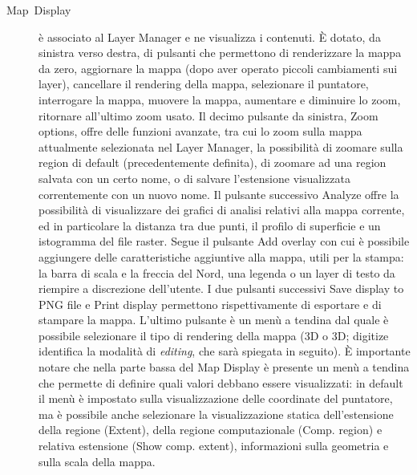 \begin{description}
			\item [{Map~Display}] è associato al Layer Manager e ne visualizza i contenuti. È dotato, da sinistra verso destra, di pulsanti che permettono di renderizzare la mappa da zero, aggiornare la mappa (dopo aver operato piccoli cambiamenti sui layer), cancellare il rendering della mappa, selezionare il puntatore, interrogare la mappa, muovere la mappa, aumentare e diminuire lo zoom, ritornare all'ultimo zoom usato. Il decimo pulsante da sinistra, \textsf{Zoom options}, offre delle funzioni avanzate, tra cui lo zoom sulla mappa attualmente selezionata nel Layer Manager, la possibilità di zoomare sulla region di default (precedentemente definita), di zoomare ad una region salvata con un certo nome, o di salvare l'estensione visualizzata correntemente con un nuovo nome. Il pulsante successivo \textsf{Analyze} offre la possibilità di visualizzare dei grafici di analisi relativi alla mappa corrente, ed in particolare la distanza tra due punti, il profilo di superficie e un istogramma del file raster. Segue il pulsante \textsf{Add overlay} con cui è possibile aggiungere delle caratteristiche aggiuntive alla mappa, utili per la stampa: la barra di scala e la freccia del Nord, una legenda o un layer di testo da riempire a discrezione dell'utente. I due pulsanti successivi \textsf{Save display to PNG file} e \textsf{Print display} permettono rispettivamente di esportare e di stampare la mappa. L'ultimo pulsante è un menù a tendina dal quale è possibile selezionare il tipo di rendering della mappa (3D o 3D; \textsf{digitize} identifica la modalità di \emph{editing}, che sarà spiegata in seguito). È importante notare che nella parte bassa del Map Display è presente un menù a tendina che permette di definire quali valori debbano essere visualizzati: in default il menù è impostato sulla visualizzazione delle coordinate del puntatore, ma è possibile anche selezionare la visualizzazione statica dell'estensione della regione (\textsf{Extent}), della regione computazionale (\textsf{Comp. region}) e relativa estensione (\textsf{Show comp. extent}), informazioni sulla geometria e sulla scala della mappa.
		\end{description}
